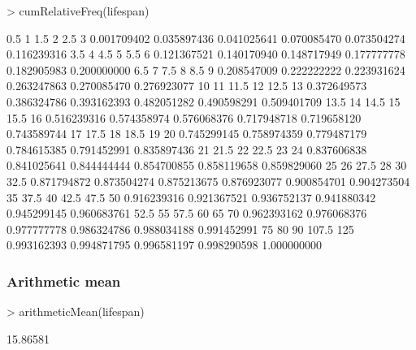 \documentclass[a4paper]{article}
\begin{document}
\begin{Schunk}
\begin{Sinput}
> cumRelativeFreq(lifespan)
\end{Sinput}
\begin{Soutput}
        0.5           1         1.5           2         2.5           3 
0.001709402 0.035897436 0.041025641 0.070085470 0.073504274 0.116239316 
        3.5           4         4.5           5         5.5           6 
0.121367521 0.140170940 0.148717949 0.177777778 0.182905983 0.200000000 
        6.5           7         7.5           8         8.5           9 
0.208547009 0.222222222 0.223931624 0.263247863 0.270085470 0.276923077 
         10          11        11.5          12        12.5          13 
0.372649573 0.386324786 0.393162393 0.482051282 0.490598291 0.509401709 
       13.5          14        14.5          15        15.5          16 
0.516239316 0.574358974 0.576068376 0.717948718 0.719658120 0.743589744 
         17        17.5          18        18.5          19          20 
0.745299145 0.758974359 0.779487179 0.784615385 0.791452991 0.835897436 
         21        21.5          22        22.5          23          24 
0.837606838 0.841025641 0.844444444 0.854700855 0.858119658 0.859829060 
         25          26        27.5          28          30        32.5 
0.871794872 0.873504274 0.875213675 0.876923077 0.900854701 0.904273504 
         35        37.5          40        42.5        47.5          50 
0.916239316 0.921367521 0.936752137 0.941880342 0.945299145 0.960683761 
       52.5          55        57.5          60          65          70 
0.962393162 0.976068376 0.977777778 0.986324786 0.988034188 0.991452991 
         75          80          90       107.5         125 
0.993162393 0.994871795 0.996581197 0.998290598 1.000000000 
\end{Soutput}
\end{Schunk}


\subsubsection*{Arithmetic mean}

\begin{Schunk}
\begin{Sinput}
> arithmeticMean(lifespan)
\end{Sinput}
\begin{Soutput}
[1] 15.86581
\end{Soutput}
\end{Schunk}
\end{document}
